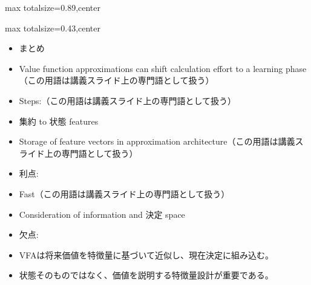 \begin{minipage}[t]{0.58\textwidth}
\begin{adjustbox}{max totalsize={\textwidth}{0.89\textheight},center}
\begin{minipage}{\textwidth}
\end{minipage}
\end{adjustbox}
\end{minipage}


\clearpage
{}
\begin{minipage}[t]{0.405\textwidth}
\begin{adjustbox}{max totalsize={\textwidth}{0.43\textheight},center}
\begin{minipage}{\textwidth}\scriptsize
{}\begin{itemize}
\item まとめ
\item Value function approximations can shift calculation effort to a learning phase（この用語は講義スライド上の専門語として扱う）
\item Steps:（この用語は講義スライド上の専門語として扱う）
\item 集約 to 状態 features
\item Storage of feature vectors in approximation architecture（この用語は講義スライド上の専門語として扱う）
\item 利点:
\item Fast（この用語は講義スライド上の専門語として扱う）
\item Consideration of information and 決定 space
\item 欠点:
\end{itemize}\begin{itemize}
\item VFAは将来価値を特徴量に基づいて近似し、現在決定に組み込む。
\item 状態そのものではなく、価値を説明する特徴量設計が重要である。
\end{itemize}
\end{minipage}
\end{adjustbox}
\end{minipage}\hfill
